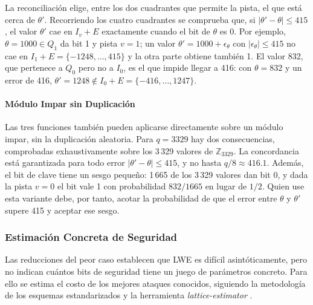 La reconciliación elige, entre los dos cuadrantes que permite la pista, el que está cerca de $\theta'$. Recorriendo los cuatro cuadrantes se comprueba que, si $|\theta' - \theta| \le 415$, el valor $\theta'$ cae en $I_v + E$ exactamente cuando el bit de $\theta$ es 0. Por ejemplo, $\theta = 1000 \in Q_1$ da bit 1 y pista $v = 1$; un valor $\theta' = 1000 + \epsilon_\theta$ con $|\epsilon_\theta| \le 415$ no cae en $I_1 + E = \{-1248, \dots, 415\}$ y la otra parte obtiene también 1. El valor 832, que pertenece a $Q_0$ pero no a $I_0$, es el que impide llegar a 416: con $\theta = 832$ y un error de 416, $\theta' = 1248 \notin I_0 + E = \{-416, \dots, 1247\}$.

\paragraph{Módulo Impar sin Duplicación}

Las tres funciones también pueden aplicarse directamente sobre un módulo impar, sin la duplicación aleatoria. Para $q = 3329$ hay dos consecuencias, comprobadas exhaustivamente sobre los 3\,329 valores de $\mathbb{Z}_{3329}$. La concordancia está garantizada para todo error $|\theta' - \theta| \le 415$, y no hasta $q/8 \approx 416.1$. Además, el bit de clave tiene un sesgo pequeño: 1\,665 de los 3\,329 valores dan bit 0, y dada la pista $v = 0$ el bit vale 1 con probabilidad $832/1665$ en lugar de $1/2$. Quien use esta variante debe, por tanto, acotar la probabilidad de que el error entre $\theta$ y $\theta'$ supere 415 y aceptar ese sesgo.

\subsubsection{Estimación Concreta de Seguridad}
\label{sec:estimacion}

Las reducciones del peor caso establecen que LWE es difícil asintóticamente, pero no indican cuántos bits de seguridad tiene un juego de parámetros concreto. Para ello se estima el costo de los mejores ataques conocidos, siguiendo la metodología de los esquemas estandarizados \cite{alkim2016newhope, avanzi2021kyber, bai2021dilithium} y la herramienta \textit{lattice-estimator} \cite{albrecht2015concrete, latticeestimator}.

